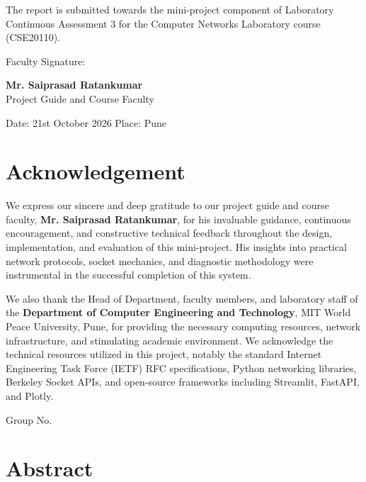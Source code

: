 \documentclass[
]{article}
\begin{document}
\vspace{0.3cm}

The report is submitted towards the mini-project component of Laboratory Continuous Assessment 3 for the Computer Networks Laboratory course (CSE20110).

\vspace{1.2cm}

Faculty Signature: \underline{\hspace{6cm}}

\textbf{Mr. Saiprasad Ratankumar}\\
Project Guide and Course Faculty

\vspace{0.5cm}

Date: 21st October 2026 \qquad Place: Pune

\newpage

\section{Acknowledgement}\label{acknowledgement}

We express our sincere and deep gratitude to our project guide and course faculty, \textbf{Mr. Saiprasad Ratankumar}, for his invaluable guidance, continuous encouragement, and constructive technical feedback throughout the design, implementation, and evaluation of this mini-project. His insights into practical network protocols, socket mechanics, and diagnostic methodology were instrumental in the successful completion of this system.

We also thank the Head of Department, faculty members, and laboratory staff of the \textbf{Department of Computer Engineering and Technology}, MIT World Peace University, Pune, for providing the necessary computing resources, network infrastructure, and stimulating academic environment. We acknowledge the technical resources utilized in this project, notably the standard Internet Engineering Task Force (IETF) RFC specifications, Python networking libraries, Berkeley Socket APIs, and open-source frameworks including Streamlit, FastAPI, and Plotly.

\vspace{0.5cm}
Group No. \underline{\hspace{2.5cm}}

\vspace{0.8cm}

\section{Abstract}\label{abstract}
\end{document}
